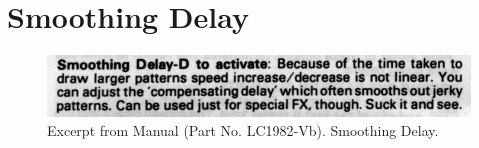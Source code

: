 \chapter{Smoothing Delay} 
\lstset{style=6502Style}

\begin{figure}[H]
    \centering
    \begin{adjustbox}{width=10.5cm,margin=0cm}
      \includegraphics[width=12cm]{src/delay/manual-entry.png}%
    \end{adjustbox}
    \caption{
      Excerpt from Manual (Part No. LC1982-Vb). Smoothing Delay.
      }
\end{figure}

